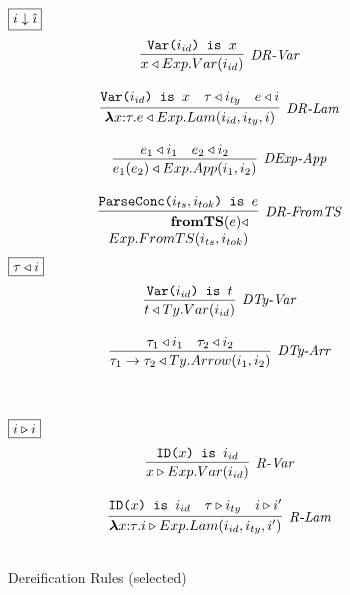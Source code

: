 \begin{figure}[t]
\centering
\begin{minipage}[t]{.51\textwidth}
$\fbox{$i \downarrow \hat{\imath}$}$
\vspace{-20px}
   \[
\begin{array}{c}
\infer[\textit{DR-Var}]
	{ x \triangleleft Exp.Var(i_{id})   }
	{ \texttt{Var($i_{id}$) is $x$}} \\[3ex]

\infer[\textit{DR-Lam}]
	{ \boldsymbol\lambda x{:}\tau . e \triangleleft Exp.Lam( i_{id}, i_{ty}, i)  }
	{ \texttt{Var($i_{id}$) is $x$} & \tau \triangleleft i_{ty} & e \triangleleft i } \\[3ex]

\infer[\textit{DExp-App}]
	{ e_1(e_2)  \triangleleft Exp.App(i_1,i_2) }
	{ e_1 \triangleleft i_1  & e_2 \triangleleft i_2   } \\[3ex]

\infer[\textit{DR-FromTS}]
          {\renewcommand{\arraystretch}{1}
	    \begin{array}{r}
	    \keyw{fromTS}(e) \triangleleft\\
            Exp.FromTS(i_{ts},i_{tok})
            \end{array}
       }
	  {\texttt{ParseConc($i_{ts},i_{tok}$) is $e$}}
\end{array}
\]
$\fbox{$\tau \triangleleft i$}$
\vspace{-20px}
\[
\begin{array}{c}
\infer[\textit{DTy-Var}]
	{ t \triangleleft Ty.Var(i_{id})   }
	{ \texttt{Var($i_{id}$) is $t$}} \\[3ex]

\infer[\textit{DTy-Arr}]
	{ \tau_1 \rightarrow \tau_2 \triangleleft Ty.Arrow(i_1,i_2 )  }
	{ \tau_1 \triangleleft i_1 & \tau_2 \triangleleft i_2 }
\end{array}
\]
\label{fig:dereification}
\vspace{-10px}
\caption{Dereification Rules (selected)}
\end{minipage}%
~\vline~
\begin{minipage}[t]{.44\textwidth}
$\fbox{$i \triangleright i$}$
\vspace{-20px}
  \[
\begin{array}{c}
\infer[\textit{R-Var}]
	{ x \triangleright Exp.Var(i_{id})   }
	{ \texttt{ID($x$) is $i_{id}$}} \\[3ex]

\infer[\textit{R-Lam}]
	{ \boldsymbol\lambda x{:}\tau . i \triangleright Exp.Lam( i_{id}, i_{ty}, i' )  }
	{\texttt{ID($x$) is $i_{id}$} & \tau \triangleright i_{ty} & i \triangleright i'  } \\[3ex]


\end{array}\]
\end{minipage}
\end{figure}
